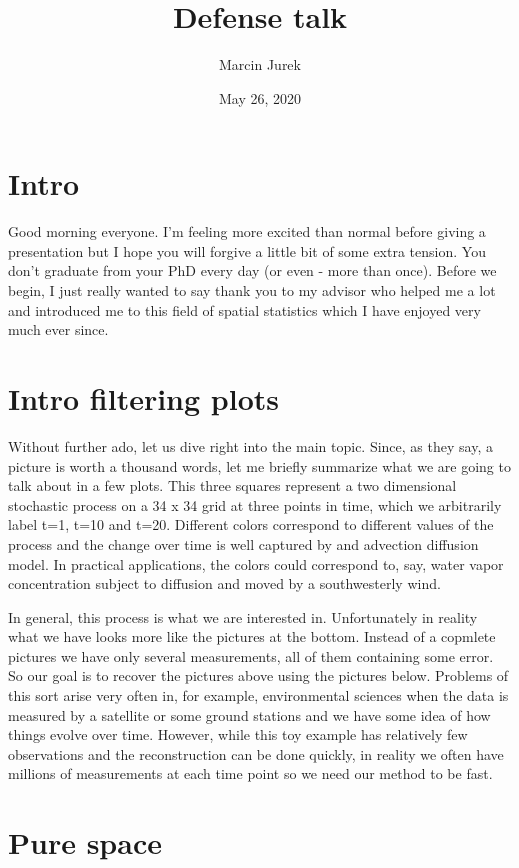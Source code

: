 \documentclass[12pt]{article} %
\title{Defense talk}
\author{Marcin Jurek}
\date{May 26, 2020} %
\begin{document}
\maketitle

\section*{Intro}
Good morning everyone. I'm feeling more excited than normal before giving a presentation but I hope you will forgive a little bit of some extra tension. You don't graduate from your PhD every day (or even - more than once). Before we begin, I just really wanted to say thank you to my advisor who helped me a lot and introduced me to this field of spatial statistics which I have enjoyed very much ever since.


\newpage
\section*{Intro filtering plots}

Without further ado, let us dive right into the main topic. Since, as they say, a picture is worth a thousand words, let me briefly summarize what we are going to talk about in a few plots. This three squares represent a two dimensional stochastic process on a 34 x 34 grid at three points in time, which we arbitrarily label t=1, t=10 and t=20. Different colors correspond to different values of the process and the change over time is well captured by and advection diffusion model. In practical applications, the colors could correspond to, say, water vapor concentration subject to diffusion and moved by a southwesterly wind. 

In general, this process is what we are interested in. Unfortunately in reality what we have looks more like the pictures at the bottom. Instead of a copmlete pictures we have only several measurements, all of them containing some error. So our goal is to recover the pictures above using the pictures below. Problems of this sort arise very often in, for example, environmental sciences when the data is measured by a satellite or some ground stations and we have some idea of how things evolve over time. However, while this toy example has relatively few observations and the reconstruction can be done quickly, in reality we often have millions of measurements at each time point so we need our method to be fast.


\newpage
\section*{Pure space}
\end{document}
